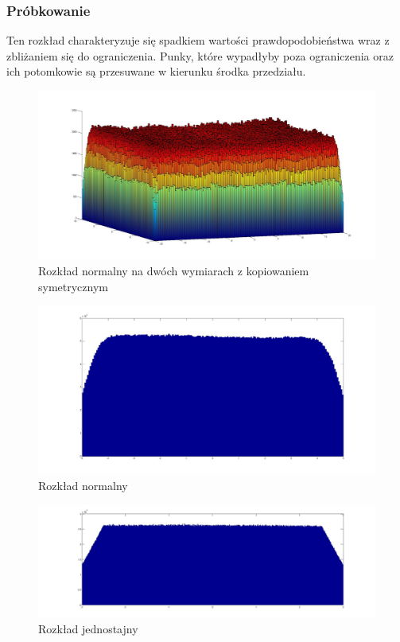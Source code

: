 \documentclass{mini}
\begin{document}
\subsubsection*{Próbkowanie}
Ten rozkład charakteryzuje się spadkiem wartości prawdopodobieństwa wraz z zbliżaniem się do ograniczenia. Punky, które wypadłyby poza ograniczenia oraz ich potomkowie są przesuwane w kierunku środka przedziału.

\begin{figure}[H]
\centering
\includegraphics[width=\textwidth]{s_n_10M_2__20_20__10_10_4_2}
\caption{Rozkład normalny na dwóch wymiarach z kopiowaniem symetrycznym}
\end{figure}

\begin{figure}[H]
\centering
\includegraphics[width=\textwidth]{s_n_10M_1__5_5}
\caption{Rozkład normalny}
\end{figure}

\begin{figure}[H]
\centering
\includegraphics[width=\textwidth]{s_j_20M_1__3_3}
\caption{Rozkład jednostajny}
\label{bladzenie:probkowanie1dj}
\end{figure}
\end{document}
